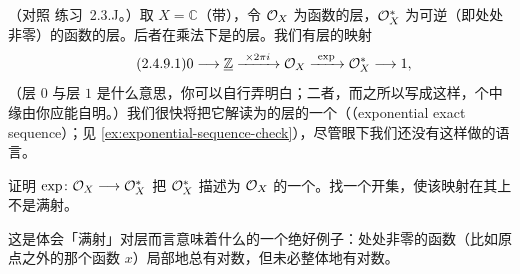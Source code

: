 \begin{example}\label{thm:exponential-sequence-example}
（对照 \mbox{练习~2.3.J}。）取 $X=\mathbb{C}$（带\trClassicalTopology），令 $\mathcal{O}_X$ 为\trHolomorphic{}函数的层，$\mathcal{O}_X^*$ 为可逆（即处处非零）的\trHolomorphic{}函数的层。后者在乘法下是\trAbelianGroups{}的层。我们有层的映射
\begin{equation*}\tag{2.4.9.1}\label{eq:exponential-sequence}
0\longrightarrow\underline{\mathbb{Z}}\xrightarrow{\ \times 2\pi i\ }\OO_X\xrightarrow{\ \exp\ }\OO_X^*\longrightarrow 1,
\end{equation*}
（层 $0$ 与层 $1$ 是什么意思，你可以自行弄明白；二者\trIsomorphic，而之所以写成这样，个中缘由你应能自明。）我们很快将把它解读为\trAbelianGroups{}的层的一个\trExactSequence（\textbf{\trExponentialSequence}（exponential exact sequence）；见 \cref{ex:exponential-sequence-check}），尽管眼下我们还没有这样做的语言。
\end{example}

\begin{exercise}[富于启发的练习]\label{ex:exp-quotient-sheaf}
证明 $\exp\colon\mathcal{O}_X\longrightarrow\mathcal{O}_X^*$ 把 $\mathcal{O}_X^*$ 描述为 $\mathcal{O}_X$ 的一个\trQuotientSheaf。找一个开集，使该映射在其上不是满射。
\end{exercise}

这是体会「满射」对层而言意味着什么的一个绝好例子：处处非零的\trHolomorphic{}函数（比如原点之外的那个函数 $x$）局部地总有对数，但未必整体地有对数。
